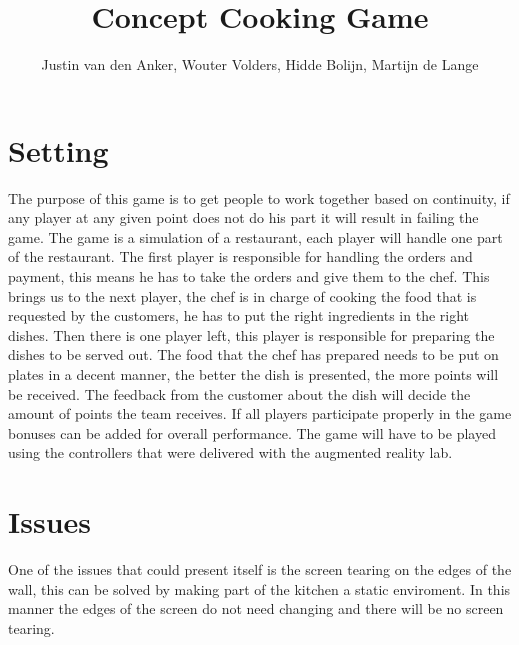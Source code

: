 \documentclass[10pt,a4paper]{article}
\author{Justin van den Anker, Wouter Volders, Hidde Bolijn, Martijn de Lange}
\title{Concept Cooking Game}
\begin{document}
\section{Setting}
The purpose of this game is to get people to work together based on continuity, if any player at any given point does not do his part it will result in failing the game. The game is a simulation of a restaurant, each player will handle one part of the restaurant. The first player is responsible for handling the orders and payment, this means he has to take the orders and give them to the chef. This brings us to the next player, the chef is in charge of cooking the food that is requested by the customers, he has to put the right ingredients in the right dishes. Then there is one player left, this player is responsible for preparing the dishes to be served out. The food that the chef has prepared needs to be put on plates in a decent manner, the better the dish is presented, the more points will be received. The feedback from the customer about the dish will decide the amount of points the team receives. If all players participate properly in the game bonuses can be added for overall performance. The game will have to be played using the controllers that were delivered with the augmented reality lab. 

\section{Issues}
One of the issues that could present itself is the screen tearing on the edges of the wall, this can be solved by making part of the kitchen a static enviroment. In this manner the edges of the screen do not need changing and there will be no screen tearing.
\end{document}
